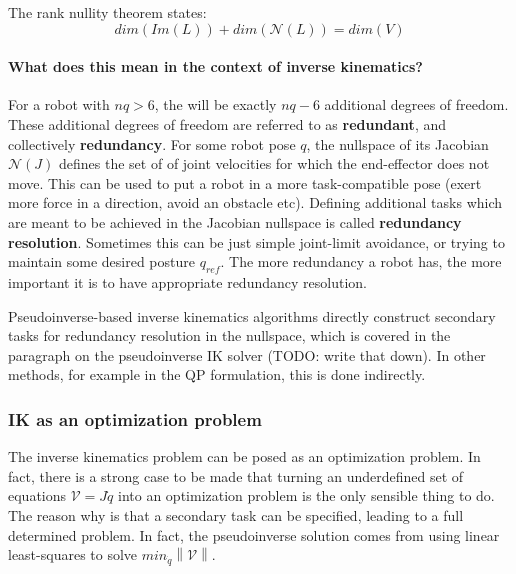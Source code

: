 The rank nullity theorem states:
\begin{equation}
dim(Im(L)) + dim(\mathcal{N}(L)) = dim(V)
\end{equation}

\paragraph{What does this mean in the context of inverse kinematics?}
For a robot with $nq > 6$, the will be exactly $nq - 6$ additional degrees of freedom.
These additional degrees of freedom are referred to as \textbf{redundant},
and collectively \textbf{redundancy}.
For some robot pose $q$, the nullspace of its Jacobian $\mathcal{N}(J)$ defines the set of 
of joint velocities for which the end-effector does not move.
This can be used to put a robot in a more task-compatible pose (exert more force in a direction,
avoid an obstacle etc). Defining additional tasks which are meant to be achieved
in the Jacobian nullspace is called \textbf{redundancy resolution}.
Sometimes this can be just simple joint-limit avoidance, or trying to maintain
some desired posture $q_{ref}$.
The more redundancy a robot has, the more important it is to have appropriate redundancy resolution.

Pseudoinverse-based inverse kinematics algorithms directly construct secondary tasks for redundancy resolution
in the nullspace, which is covered in the paragraph on the pseudoinverse IK solver (TODO: write that down).
In other methods, for example in the QP formulation, this is done indirectly.


\subsubsection{IK as an optimization problem}
The inverse kinematics problem can be posed as an optimization problem.
In fact, there is a strong case to be made that turning an underdefined
set of equations $\mathcal{V} = J \dot{q}$ into an optimization problem is the only sensible thing to do.
The reason why is that a secondary task can be specified, leading to a full determined problem.
In fact, the pseudoinverse solution comes from using linear least-squares
to solve $min_{\dot{q}} \left\lVert \mathcal{V}\right \rVert$.

